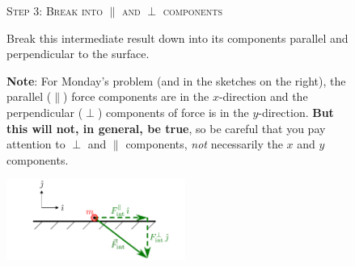 \documentclass[10pt,letterpaper,twoside]{article}
\begin{document}
\FloatBarrier
\begin{figure}[h!]
  \begin{minipage}[l]{0.70\textwidth}
	{\Large\textsc{Step 3}:} {\large\textsc{Break into $\parallel$ and $\perp$ components}}{\quad}

	Break this intermediate result down into its components parallel and perpendicular to the surface.

	\vspace{10pt}
	\textbf{Note}: For Monday's problem (and in the sketches on the right), the parallel ($\parallel$) force components are in the $x$-direction and the perpendicular ($\perp$) components of force is in the $y$-direction.
	\textbf{But this will not, in  general, be true}, so be careful that you pay attention to $\perp$ and $\parallel$ components, \textit{not} necessarily the $x$ and $y$ components.
  \end{minipage}
  \begin{minipage}[l]{0.25\textwidth}
	\includegraphics[keepaspectratio=true,width=2.30in]{./how_to_normal_force_and_friction_f03.pdf}
    \label{fig:03}
  \end{minipage}
\end{figure}
\FloatBarrier
\end{document}
